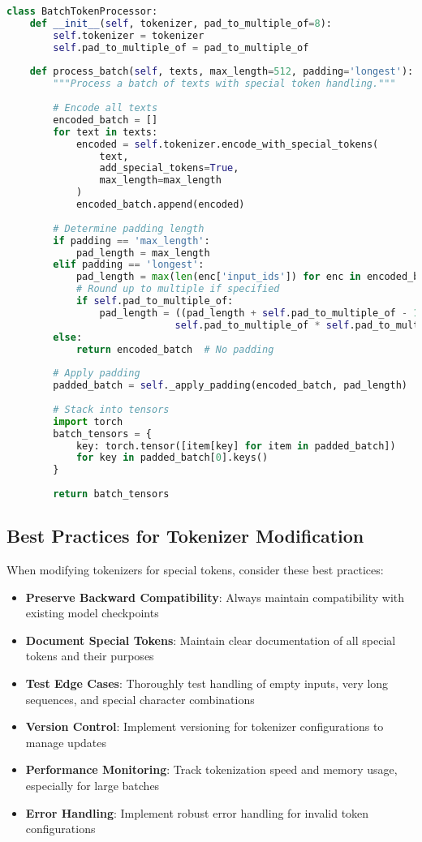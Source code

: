 \begin{lstlisting}[language=Python, caption=Batch processing with special token alignment]
class BatchTokenProcessor:
    def __init__(self, tokenizer, pad_to_multiple_of=8):
        self.tokenizer = tokenizer
        self.pad_to_multiple_of = pad_to_multiple_of
        
    def process_batch(self, texts, max_length=512, padding='longest'):
        """Process a batch of texts with special token handling."""
        
        # Encode all texts
        encoded_batch = []
        for text in texts:
            encoded = self.tokenizer.encode_with_special_tokens(
                text, 
                add_special_tokens=True,
                max_length=max_length
            )
            encoded_batch.append(encoded)
            
        # Determine padding length
        if padding == 'max_length':
            pad_length = max_length
        elif padding == 'longest':
            pad_length = max(len(enc['input_ids']) for enc in encoded_batch)
            # Round up to multiple if specified
            if self.pad_to_multiple_of:
                pad_length = ((pad_length + self.pad_to_multiple_of - 1) // 
                             self.pad_to_multiple_of * self.pad_to_multiple_of)
        else:
            return encoded_batch  # No padding
            
        # Apply padding
        padded_batch = self._apply_padding(encoded_batch, pad_length)
        
        # Stack into tensors
        import torch
        batch_tensors = {
            key: torch.tensor([item[key] for item in padded_batch])
            for key in padded_batch[0].keys()
        }
        
        return batch_tensors
\end{lstlisting}

\subsection{Best Practices for Tokenizer Modification}

When modifying tokenizers for special tokens, consider these best practices:

\begin{itemize}
\item \textbf{Preserve Backward Compatibility}: Always maintain compatibility with existing model checkpoints
\item \textbf{Document Special Tokens}: Maintain clear documentation of all special tokens and their purposes
\item \textbf{Test Edge Cases}: Thoroughly test handling of empty inputs, very long sequences, and special character combinations
\item \textbf{Version Control}: Implement versioning for tokenizer configurations to manage updates
\item \textbf{Performance Monitoring}: Track tokenization speed and memory usage, especially for large batches
\item \textbf{Error Handling}: Implement robust error handling for invalid token configurations
\end{itemize}